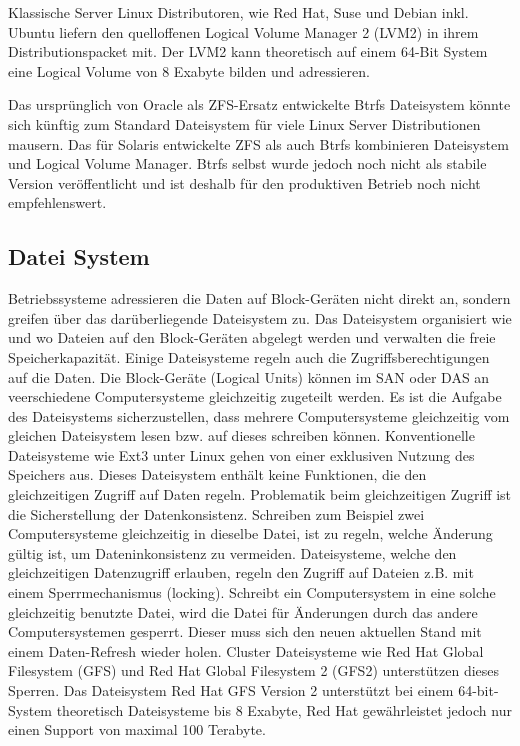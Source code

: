 Klassische Server Linux Distributoren, wie Red Hat, Suse und Debian inkl. Ubuntu liefern den quelloffenen Logical Volume Manager 2 (LVM2) in ihrem Distributionspacket mit. Der LVM2 kann theoretisch auf einem 64-Bit System eine Logical Volume von 8 Exabyte bilden und adressieren. \cite{Levine2009}

Das ursprünglich von Oracle als ZFS-Ersatz entwickelte Btrfs Dateisystem könnte sich künftig zum Standard Dateisystem für viele Linux Server Distributionen mausern. Das für Solaris entwickelte ZFS als auch Btrfs kombinieren Dateisystem und Logical Volume Manager. Btrfs selbst wurde jedoch noch nicht als stabile Version veröffentlicht und ist deshalb für den produktiven Betrieb noch nicht empfehlenswert. \cite{Redler2011}


\subsection{Datei System}
Betriebssysteme adressieren die Daten auf Block-Geräten nicht direkt an, sondern greifen über das darüberliegende Dateisystem zu. Das Dateisystem organisiert wie und wo Dateien auf den Block-Geräten abgelegt werden und verwalten die freie Speicherkapazität. Einige Dateisysteme regeln auch die Zugriffsberechtigungen auf die Daten. Die Block-Geräte (Logical Units) können im SAN oder DAS an veerschiedene Computersysteme gleichzeitig zugeteilt werden. Es ist die Aufgabe des Dateisystems sicherzustellen, dass mehrere Computersysteme gleichzeitig vom gleichen Dateisystem lesen bzw. auf dieses schreiben können. Konventionelle Dateisysteme wie Ext3 unter Linux gehen von einer exklusiven Nutzung des Speichers aus. Dieses Dateisystem enthält keine Funktionen, die den gleichzeitigen Zugriff auf Daten regeln. Problematik beim gleichzeitigen Zugriff ist die Sicherstellung der Datenkonsistenz. Schreiben zum Beispiel zwei Computersysteme gleichzeitig in dieselbe Datei, ist zu regeln, welche Änderung gültig ist, um Dateninkonsistenz zu vermeiden. Dateisysteme, welche den gleichzeitigen Datenzugriff erlauben, regeln den Zugriff auf Dateien z.B. mit einem Sperrmechanismus (locking). Schreibt ein Computersystem in eine solche gleichzeitig benutzte Datei, wird die Datei für Änderungen durch das andere Computersystemen gesperrt. Dieser muss sich den neuen aktuellen Stand mit einem Daten-Refresh wieder holen. Cluster Dateisysteme wie Red Hat Global Filesystem (GFS) und Red Hat Global Filesystem 2 (GFS2) unterstützen dieses Sperren. Das Dateisystem Red Hat GFS Version 2 unterstützt bei einem 64-bit-System theoretisch Dateisysteme bis 8 Exabyte, Red Hat gewährleistet jedoch nur einen Support von maximal 100 Terabyte. \cite{Levine2011}


